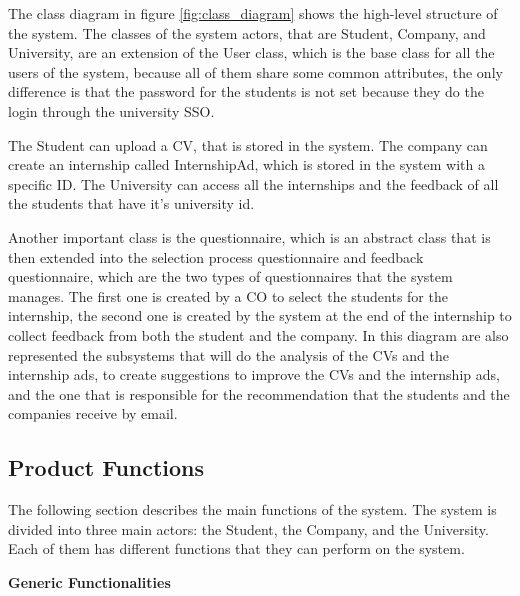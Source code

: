 \par The class diagram in figure \ref{fig:class_diagram} shows the high-level structure of the system. The classes of
the system actors, that are Student, Company, and University, are an extension of the User class, which is the base
class for all the users of the system, because all of them share some common attributes, the only difference is that
the password for the students is not set because they do the login through the university SSO.

\par The Student can upload a CV, that is stored in the system. The company can create an internship called
InternshipAd, which is stored in the system with a specific ID. The University can access all the internships and the
feedback of all the students that have it's university id.

\par Another important class is the questionnaire, which is an abstract class that is then extended into the selection
process questionnaire and feedback questionnaire, which are the two types of questionnaires that the system manages.
The first one is created by a CO to select the students for the internship, the second one is created by the system at
the end of the internship to collect feedback from both the student and the company. In this diagram are also
represented the subsystems that will do the analysis of the CVs and the internship ads, to create suggestions to
improve the CVs and the internship ads, and the one that is responsible for the recommendation that the students and
the companies receive by email.

\subsection{Product Functions}
\label{sec:product_functions}%

\par The following section describes the main functions of the system. The system is divided into three main actors:
the Student, the Company, and the University. Each of them has different functions that they can perform on the system.

\par\textbf{Generic Functionalities}

